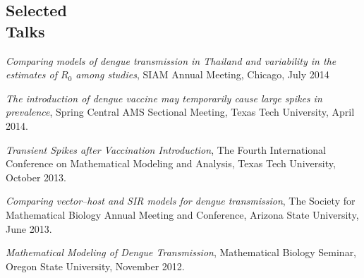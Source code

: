 \documentclass[margin,line,pifont,palatino,courier]{res}
\begin{document}
\begin{resume}





\section{\sc Selected \\ Talks}

\emph{Comparing models of dengue transmission in Thailand and
  variability in the estimates of $R_0$ among studies}, SIAM Annual
Meeting, Chicago, July 2014


\emph{The introduction of dengue vaccine may temporarily cause large spikes in prevalence}, Spring Central AMS Sectional Meeting,
Texas Tech University, April 2014.




\emph{Transient Spikes after Vaccination Introduction}, The Fourth International Conference on Mathematical
Modeling and Analysis, Texas Tech University, October 2013.

\emph{Comparing vector--host and SIR models for dengue transmission}, The Society for Mathematical Biology
Annual Meeting and Conference, Arizona State University, June 2013.

\emph{Mathematical Modeling of Dengue Transmission}, Mathematical Biology Seminar, Oregon State University, November 2012.




\end{resume}
\end{document}
